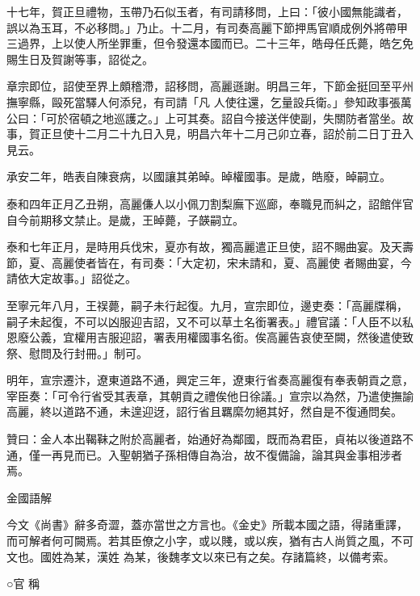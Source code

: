 \begin{pinyinscope}
 十七年，賀正旦禮物，玉帶乃石似玉者，有司請移問，上曰：「彼小國無能識者，誤以為玉耳，不必移問。」乃止。十二月，有司奏高麗下節押馬官順成例外將帶甲三過界，上以使人所坐罪重，但令發還本國而已。二十三年，皓母任氏薨，皓乞免賜生日及賀謝等事，詔從之。



 章宗即位，詔使至界上頗稽滯，詔移問，高麗遜謝。明昌三年，下節金挺回至平州撫寧縣，毆死當驛人何添兒，有司請「凡
 人使往還，乞量設兵衛。」參知政事張萬公曰：「可於宿頓之地巡護之。」上可其奏。詔自今接送伴使副，失關防者當坐。故事，賀正旦使十二月二十九日入見，明昌六年十二月己卯立春，詔於前二日丁丑入見云。



 承安二年，皓表自陳衰病，以國讓其弟晫。晫權國事。是歲，皓廢，晫嗣立。



 泰和四年正月乙丑朔，高麗傔人以小佩刀割梨廡下巡廊，奉職見而糾之，詔館伴官自今前期移文禁止。是歲，王晫薨，子韺嗣立。



 泰和七年正月，是時用兵伐宋，夏亦有故，獨高麗遣正旦使，詔不賜曲宴。及天壽節，夏、高麗使者皆在，有司奏：「大定初，宋未請和，夏、高麗使
 者賜曲宴，今請依大定故事。」詔從之。



 至寧元年八月，王祦薨，嗣子未行起復。九月，宣宗即位，邊吏奏：「高麗牒稱，嗣子未起復，不可以凶服迎吉詔，又不可以草土名銜署表。」禮官議：「人臣不以私恩廢公義，宜權用吉服迎詔，署表用權國事名銜。俟高麗告哀使至闕，然後遣使致祭、慰問及行封冊。」制可。



 明年，宣宗遷汴，遼東道路不通，興定三年，遼東行省奏高麗復有奉表朝貢之意，宰臣奏：「可令行省受其表章，其朝貢之禮俟他日徐議。」宣宗以為然，乃遣使撫諭高麗，終以道路不通，未遑迎迓，詔行省且羈縻勿絕其好，然自是不復通問矣。



 贊曰：金人本出鞨靺之附於高麗者，始通好為鄰國，既而為君臣，貞祐以後道路不通，僅一再見而已。入聖朝猶子孫相傳自為治，故不復備論，論其與金事相涉者
 焉。



 金國語解



 今文《尚書》辭多奇澀，蓋亦當世之方言也。《金史》所載本國之語，得諸重譯，而可解者何可闕焉。若其臣僚之小字，或以賤，或以疾，猶有古人尚質之風，不可文也。國姓為某，漢姓
 為某，後魏孝文以來已有之矣。存諸篇終，以備考索。



 ○官
 稱




\end{pinyinscope}
